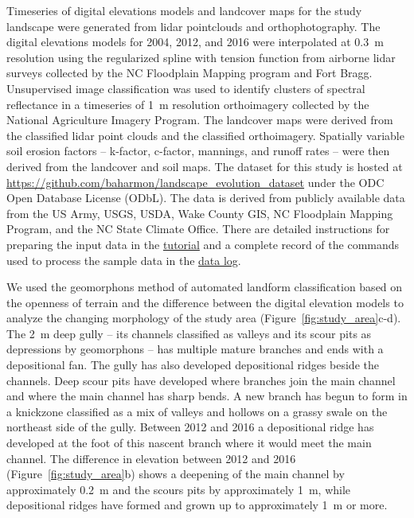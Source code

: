 \documentclass[gmd, manuscript]{copernicus}
\begin{document}
Timeseries of digital elevations models 
and landcover maps for the study landscape
were generated from lidar pointclouds and orthophotography.
The digital elevations models for 2004, 2012, and 2016
were interpolated at 0.3~\unit{m} resolution
using the regularized spline with tension function \citep{Mitasova1993,Mitasova2005}
from airborne lidar surveys 
collected by the NC Floodplain Mapping program and Fort Bragg. 
%
Unsupervised image classification 
was used to identify clusters of spectral reflectance
in a timeseries of 1~\unit{m} resolution orthoimagery 
collected by the National Agriculture Imagery Program.
The landcover maps were derived from the
classified lidar point clouds and the classified orthoimagery.
Spatially variable soil erosion factors 
-- k-factor, c-factor, mannings, and runoff rates --
were then derived from the landcover and soil maps.
The dataset for this study is hosted at 
\url{https://github.com/baharmon/landscape\_evolution_dataset}
under the ODC Open Database License (ODbL).
The data is derived from publicly available data from
the US Army, USGS, USDA, Wake County GIS, NC Floodplain
Mapping Program, and the NC State Climate Office.
There are detailed instructions for preparing the input data in the 
\href{https://github.com/baharmon/landscape_evolution/blob/master/tutorial.md}{tutorial}
and a complete record of the commands used to process the sample data in the
\href{https://github.com/baharmon/landscape_evolution_dataset/blob/master/nc_spm_evolution/DATA.md}{data log}.

We used the geomorphons method 
of automated landform classification
based on the openness of terrain \citep{Jasiewicz2013}
and the difference between the digital elevation models 
to analyze the changing morphology of the study area
(Figure~\ref{fig:study_area}c-d). 
%
The 2~\unit{m} deep gully -- 
its channels classified as valleys and 
its scour pits as depressions by geomorphons -- 
has multiple mature branches
and ends with a depositional fan.
%
The gully has also developed 
depositional ridges beside the channels.
Deep scour pits have developed 
where branches join the main channel 
and where the main channel has sharp bends.
%
A new branch has begun to form 
in a knickzone classified as a mix of valleys and hollows
on a grassy swale on the northeast side of the gully.
Between 2012 and 2016 a depositional ridge
has developed at the foot of this nascent branch
where it would meet the main channel. 
%
The difference in elevation between 2012 and 2016
(Figure~\ref{fig:study_area}b)
shows a deepening of the main channel 
by approximately 0.2~\unit{m} 
and the scours pits
by approximately 1~\unit{m},
while depositional ridges have formed and grown up to
approximately 1~\unit{m} or more.
\end{document}
